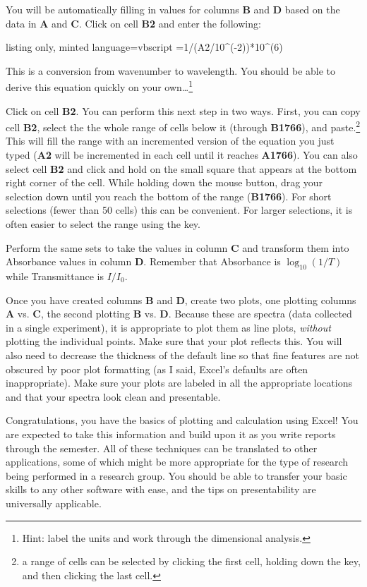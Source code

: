 \documentclass[nobib,nofonts,nols,nohyper]{tufte-handout}
\begin{document}
You will be automatically filling in values for columns \textbf{B} and \textbf{D} based on the data in \textbf{A} and \textbf{C}. 
Click on cell \textbf{B2} and enter the following:

\begin{tcblisting}{listing only,
minted language=vbscript}
=1/(A2/10^(-2))*10^(6)
\end{tcblisting}

This is a conversion from wavenumber to wavelength. 
You should be able to derive this equation quickly on your own…\footnote{Hint: label the units and work through the dimensional analysis.}

Click on cell \textbf{B2}. 
You can perform this next step in two ways. 
First, you can copy cell \textbf{B2}, select the the whole range of cells below it (through \textbf{B1766}), and paste.\footnote{a range of cells can be selected by clicking the first cell, holding down the  key, and then clicking the last cell.} 
This will fill the range with an incremented version of the equation you just typed (\textbf{A2} will be incremented in each cell until it reaches \textbf{A1766}). 
You can also select cell \textbf{B2} and click and hold on the small square that appears at the bottom right corner of the cell. 
While holding down the mouse button, drag your selection down until you reach the bottom of the range (\textbf{B1766}). 
For short selections (fewer than 50 cells) this can be convenient. 
For larger selections, it is often easier to select the range using the  key.

Perform the same sets to take the values in column \textbf{C} and transform them into Absorbance values in column \textbf{D}. 
Remember that Absorbance is \(\log_{10}(1/T)\) while Transmittance is \(I / I_0\).

Once you have created columns \textbf{B} and \textbf{D}, create two plots, one plotting columns \textbf{A} vs. \textbf{C}, the second plotting \textbf{B} vs. \textbf{D}. 
Because these are spectra (data collected in a single experiment), it is appropriate to plot them as line plots, \emph{without} plotting the individual points. 
Make sure that your plot reflects this. 
You will also need to decrease the thickness of the default line so that fine features are not obscured by poor plot formatting (as I said, Excel's defaults are often inappropriate). 
Make sure your plots are labeled in all the appropriate locations and that your spectra look clean and presentable.

Congratulations, you have the basics of plotting and calculation using Excel! 
You are expected to take this information and build upon it as you write reports through the semester. 
All of these techniques can be translated to other applications, some of which might be more appropriate for the type of research being performed in a research group. 
You should be able to transfer your basic skills to any other software with ease, and the tips on presentability are universally applicable.
\end{document}
